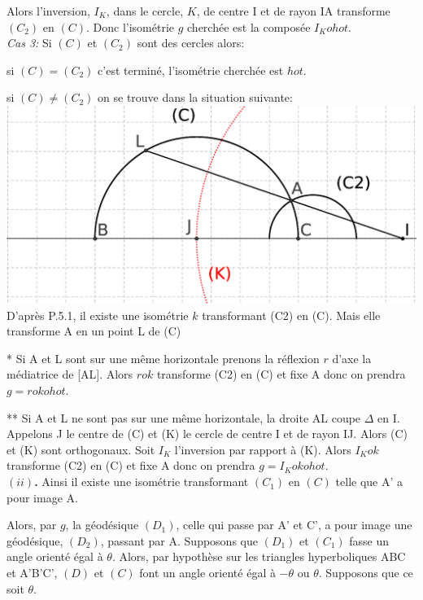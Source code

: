 \documentclass[a4paper, 12pt, twoside]{book}
\begin{document}
  
  Alors l'inversion, $I_{K}$,  dans le cercle, $K$, de centre I et de rayon IA transforme   $(C_{2})$ en $(C)$. Donc l'isométrie $g$ cherchée est la composée $I_{K}ohot$.\\ 
  
   \textit{Cas 3:} Si  $(C)$ et $(C_{2})$ sont des cercles alors:\
   
   si $(C)=(C_{2})$ c'est terminé, l'isométrie cherchée est $hot$.\
   
   si  $(C)\neq (C_{2})$ on se trouve dans la situation suivante:\\
   
   
   \includegraphics[scale=0.5]{figures/hyper116.eps} \\
   
D'après P.5.1, il existe une isométrie $k$ transformant (C2) en (C). Mais elle transforme A en un point L de (C)\

* Si A et L sont sur une même horizontale prenons la réflexion $r$ d'axe la médiatrice de [AL]. Alors $rok$ transforme (C2) en (C) et fixe A donc on prendra $g=rokohot$.\

** Si A et L ne sont pas sur une même horizontale, la droite AL coupe $\Delta$ en I. Appelons J le centre de (C) et (K) le cercle de centre I et de rayon IJ. Alors (C) et (K) sont orthogonaux. Soit $I_{K}$ l'inversion par rapport à (K). Alors $I_{K}ok$ transforme (C2) en (C) et fixe A donc on prendra $g=I_{K}okohot$.\\
  
  
   
 
 
 
 \textbf{$(ii)$.} Ainsi il existe une isométrie transformant $(C_{1})$ en $(C)$ telle que A' a pour image A. \
 
 Alors, par $g$, la géodésique $(D_{1})$, celle qui passe par A' et C', a pour image une géodésique, $(D_{2})$, passant par A. Supposons que $(D_{1})$ et $(C_{1})$ fasse un angle orienté égal à $\theta$. Alors, par hypothèse sur les triangles hyperboliques ABC et A'B'C', $(D)$ et $(C)$ font un angle orienté égal à $-\theta$ ou $\theta$. Supposons que ce soit $\theta$. \
 
\end{document}
